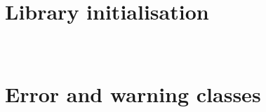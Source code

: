 \documentclass{manual}
\makeatletter
\let\py@OldOldChapter=\chapter
\renewcommand{\chapter}{\py@reset%
                        \py@OldOldChapter}
\makeatother
\begin{document}
\chapter[\protect\module{pygsl.init} --- Library initialisation]
{\protect{} \\ Library initialisation}
\label{cha:library-initialisation}


\chapter[\protect\module{pygsl.errors} --- Error and warning classes]
{\protect{} \\ Error and warning classes} 
\label{cha:error-module}



\end{document}
